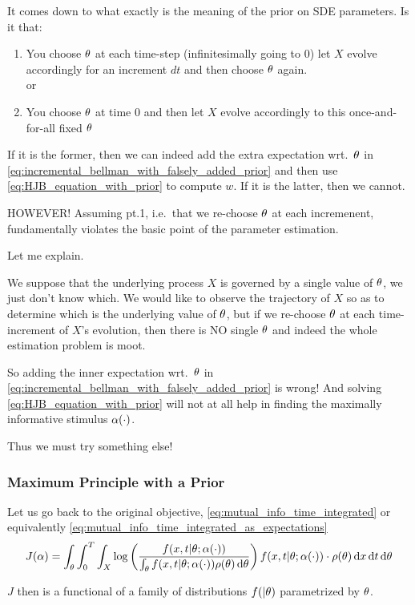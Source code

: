 \documentclass{article}
\begin{document}
It comes down to what exactly is the meaning of the prior on
SDE parameters. Is it that:
\begin{enumerate}
  \item You choose ${\theta}$ at each time-step (infinitesimally going to 0) let $X$
  evolve accordingly for an increment $dt$ and then choose ${\theta}$ again.
  \\
  or
  \item You choose ${\theta}$ at time $0$ and then let $X$ evolve accordingly to this
  once-and-for-all fixed ${\theta}$
\end{enumerate}

If it is the former, then we can indeed add the extra expectation wrt.\ ${\theta}$
in \cref{eq:incremental_bellman_with_falsely_added_prior} and then use
\cref{eq:HJB_equation_with_prior} to compute $w$. If it is the latter, then we
cannot.

HOWEVER! Assuming pt.1, i.e.\ that we re-choose ${\theta}$ at each incremenent,
fundamentally violates the basic point of the parameter estimation.

Let me explain.

We suppose that the underlying process $X$ is governed by a single value of
${\theta}$, we just don't know which. We would like to observe the
trajectory of $X$ so as to determine which is the underlying value of ${\theta}$, but
if we re-choose ${\theta}$ at each time-increment of $X$'s evolution, then there is
NO single ${\theta}$ and indeed the whole estimation problem is moot.

So adding the inner expectation wrt.\ ${\theta}$ in
\cref{eq:incremental_bellman_with_falsely_added_prior} is wrong! And solving
\cref{eq:HJB_equation_with_prior} will not at all help in finding the maximally
informative stimulus ${\alpha}(\cdot)$.

Thus we must try something else!


\subsubsection{Maximum Principle with a Prior}
\label{sec:MP_with_a_prior}
Let us go back to the original objective,
\cref{eq:mutual_info_time_integrated} or equivalently
\cref{eq:mutual_info_time_integrated_as_expectations}
$$
J({\alpha})  = \int_{\theta} \int_0^T\int_X
 \log\left(\frac{f(x,t|{\theta} ; {\alpha}(\cdot) )}
 			{\int_{\theta} f(x,t|{\theta}; {\alpha}(\cdot)) \rho({\theta})\, \mathrm{d} {\theta}}\right) 
 f(x,t|{\theta}; {\alpha}(\cdot)) \cdot \rho({\theta}) \, \mathrm{d} x\, \mathrm{d} t\, \mathrm{d} {\theta}
$$

$J$ then is a functional of a family of distributions $f(|{\theta})$ parametrized by
${\theta}$.
\end{document}
